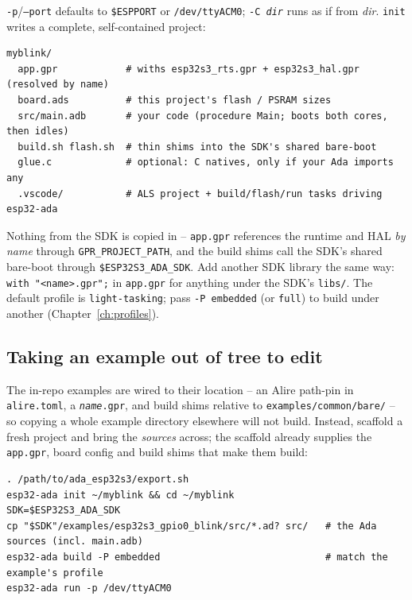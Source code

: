 \noindent\texttt{-p}/\texttt{--port} defaults to \texttt{\$ESPPORT} or
\texttt{/dev/ttyACM0}; \texttt{-C \textit{dir}} runs as if from \textit{dir}.
\texttt{init} writes a complete, self-contained project:

\begin{lstlisting}[style=sh]
myblink/
  app.gpr            # withs esp32s3_rts.gpr + esp32s3_hal.gpr (resolved by name)
  board.ads          # this project's flash / PSRAM sizes
  src/main.adb       # your code (procedure Main; boots both cores, then idles)
  build.sh flash.sh  # thin shims into the SDK's shared bare-boot
  glue.c             # optional: C natives, only if your Ada imports any
  .vscode/           # ALS project + build/flash/run tasks driving esp32-ada
\end{lstlisting}

Nothing from the SDK is copied in -- \texttt{app.gpr} references the runtime and
HAL \emph{by name} through \texttt{GPR\_PROJECT\_PATH}, and the build shims call the
SDK's shared bare-boot through \texttt{\$ESP32S3\_ADA\_SDK}. Add another SDK library
the same way: \texttt{with "<name>.gpr";} in \texttt{app.gpr} for anything under the
SDK's \texttt{libs/}. The default profile is \texttt{light-tasking}; pass
\texttt{-P embedded} (or \texttt{full}) to build under another
(Chapter~\ref{ch:profiles}).

\subsection{Taking an example out of tree to edit}

The in-repo examples are wired to their location -- an Alire path-pin in
\texttt{alire.toml}, a \texttt{\textit{name}.gpr}, and build shims relative to
\texttt{examples/common/bare/} -- so copying a whole example directory elsewhere
will not build. Instead, scaffold a fresh project and bring the \emph{sources}
across; the scaffold already supplies the \texttt{app.gpr}, board config and build
shims that make them build:

\begin{lstlisting}[style=sh]
. /path/to/ada_esp32s3/export.sh
esp32-ada init ~/myblink && cd ~/myblink
SDK=$ESP32S3_ADA_SDK
cp "$SDK"/examples/esp32s3_gpio0_blink/src/*.ad? src/   # the Ada sources (incl. main.adb)
esp32-ada build -P embedded                             # match the example's profile
esp32-ada run -p /dev/ttyACM0
\end{lstlisting}

